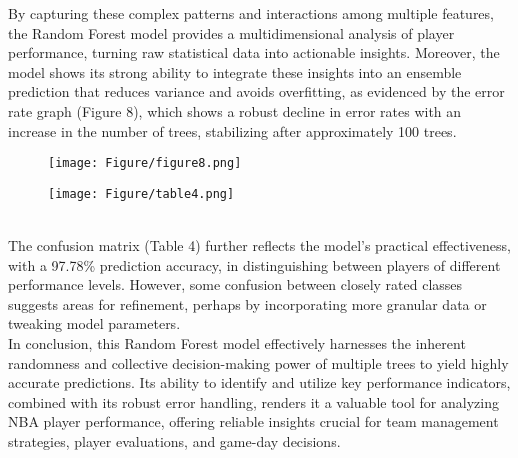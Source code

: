 \documentclass[fleqn,10pt]{SelfArx} %
\begin{document}
By capturing these complex patterns and interactions among multiple features, the Random Forest model provides a multidimensional analysis of player performance, turning raw statistical data into actionable insights. Moreover, the model shows its strong ability to integrate these insights into an ensemble prediction that reduces variance and avoids overfitting, as evidenced by the error rate graph (Figure 8), which shows a robust decline in error rates with an increase in the number of trees, stabilizing after approximately 100 trees.
\begin{figure}[ht]
    \centering
    \texttt{[image: Figure/figure8.png]}
    \label{fig:enter-label}
\end{figure}
\begin{figure}[ht]
    \centering
    \texttt{[image: Figure/table4.png]}
    \label{fig:enter-label}
\end{figure}
\\The confusion matrix (Table 4) further reflects the model's practical effectiveness, with a 97.78\% prediction accuracy,  in distinguishing between players of different performance levels. However, some confusion between closely rated classes suggests areas for refinement, perhaps by incorporating more granular data or tweaking model parameters.\\
In conclusion, this Random Forest model effectively harnesses the inherent randomness and collective decision-making power of multiple trees to yield highly accurate predictions. Its ability to identify and utilize key performance indicators, combined with its robust error handling, renders it a valuable tool for analyzing NBA player performance, offering reliable insights crucial for team management strategies, player evaluations, and game-day decisions.
\end{document}
